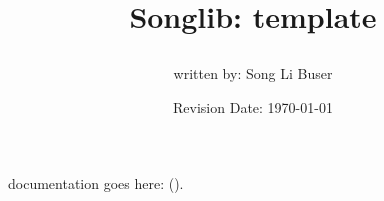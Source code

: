 \documentclass{article}
\title{Songlib: template\\
\date{Revision Date: \today}}
\author{written by: Song Li Buser}
\begin{document}
\maketitle

\W\subsubsection*{}
\W\htmlrule

\Songlib\ documentation goes here: (\songlib).
\end{document}
